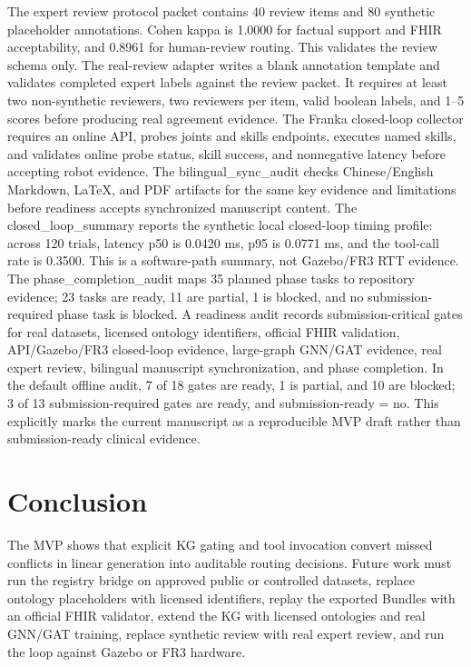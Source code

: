 \documentclass[11pt]{article}
\begin{document}
The expert review protocol packet contains 40 review items and 80 synthetic placeholder annotations. Cohen kappa is 1.0000 for factual support and FHIR acceptability, and 0.8961 for human-review routing. This validates the review schema only.
The real-review adapter writes a blank annotation template and validates completed expert labels against the review packet. It requires at least two non-synthetic reviewers, two reviewers per item, valid boolean labels, and 1--5 scores before producing real agreement evidence.
The Franka closed-loop collector requires an online API, probes joints and skills endpoints, executes named skills, and validates online probe status, skill success, and nonnegative latency before accepting robot evidence.
The bilingual\_sync\_audit checks Chinese/English Markdown, LaTeX, and PDF artifacts for the same key evidence and limitations before readiness accepts synchronized manuscript content.
The closed\_loop\_summary reports the synthetic local closed-loop timing profile: across 120 trials, latency p50 is 0.0420 ms, p95 is 0.0771 ms, and the tool-call rate is 0.3500. This is a software-path summary, not Gazebo/FR3 RTT evidence.
The phase\_completion\_audit maps 35 planned phase tasks to repository evidence; 23 tasks are ready, 11 are partial, 1 is blocked, and no submission-required phase task is blocked.
A readiness audit records submission-critical gates for real datasets, licensed ontology identifiers, official FHIR validation, API/Gazebo/FR3 closed-loop evidence, large-graph GNN/GAT evidence, real expert review, bilingual manuscript synchronization, and phase completion. In the default offline audit, 7 of 18 gates are ready, 1 is partial, and 10 are blocked; 3 of 13 submission-required gates are ready, and submission-ready = no. This explicitly marks the current manuscript as a reproducible MVP draft rather than submission-ready clinical evidence.

\section{Conclusion}
The MVP shows that explicit KG gating and tool invocation convert missed conflicts in linear generation into auditable routing decisions. Future work must run the registry bridge on approved public or controlled datasets, replace ontology placeholders with licensed identifiers, replay the exported Bundles with an official FHIR validator, extend the KG with licensed ontologies and real GNN/GAT training, replace synthetic review with real expert review, and run the loop against Gazebo or FR3 hardware.

\nocite{*}


\end{document}
